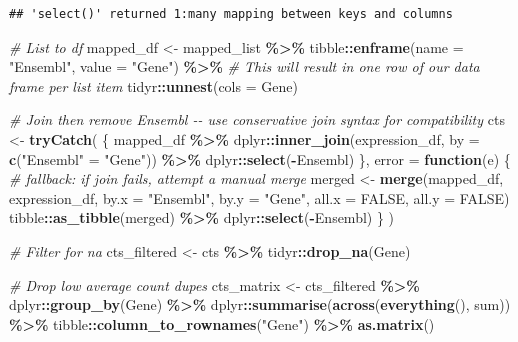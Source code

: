 \documentclass[
]{article}
\newenvironment{Shaded}{\begin{snugshade}}{\end{snugshade}}
\newcommand{\AttributeTok}[1]{\textcolor[rgb]{0.13,0.29,0.53}{#1}}
\newcommand{\CommentTok}[1]{\textcolor[rgb]{0.56,0.35,0.01}{\textit{#1}}}
\newcommand{\ConstantTok}[1]{\textcolor[rgb]{0.56,0.35,0.01}{#1}}
\newcommand{\ControlFlowTok}[1]{\textcolor[rgb]{0.13,0.29,0.53}{\textbf{#1}}}
\newcommand{\FunctionTok}[1]{\textcolor[rgb]{0.13,0.29,0.53}{\textbf{#1}}}
\newcommand{\NormalTok}[1]{#1}
\newcommand{\OtherTok}[1]{\textcolor[rgb]{0.56,0.35,0.01}{#1}}
\newcommand{\SpecialCharTok}[1]{\textcolor[rgb]{0.81,0.36,0.00}{\textbf{#1}}}
\newcommand{\StringTok}[1]{\textcolor[rgb]{0.31,0.60,0.02}{#1}}
\begin{document}
\begin{verbatim}
## 'select()' returned 1:many mapping between keys and columns
\end{verbatim}

\begin{Shaded}
\begin{Highlighting}[]
\CommentTok{\# List to df}
\NormalTok{mapped\_df }\OtherTok{\textless{}{-}}\NormalTok{ mapped\_list }\SpecialCharTok{\%\textgreater{}\%}
\NormalTok{  tibble}\SpecialCharTok{::}\FunctionTok{enframe}\NormalTok{(}\AttributeTok{name =} \StringTok{"Ensembl"}\NormalTok{, }\AttributeTok{value =} \StringTok{"Gene"}\NormalTok{) }\SpecialCharTok{\%\textgreater{}\%}
  \CommentTok{\# This will result in one row of our data frame per list item}
\NormalTok{  tidyr}\SpecialCharTok{::}\FunctionTok{unnest}\NormalTok{(}\AttributeTok{cols =}\NormalTok{ Gene)}

\CommentTok{\# Join then remove Ensembl {-}{-} use conservative join syntax for compatibility}
\NormalTok{cts }\OtherTok{\textless{}{-}} \FunctionTok{tryCatch}\NormalTok{(}
\NormalTok{  \{}
\NormalTok{    mapped\_df }\SpecialCharTok{\%\textgreater{}\%}
\NormalTok{      dplyr}\SpecialCharTok{::}\FunctionTok{inner\_join}\NormalTok{(expression\_df, }\AttributeTok{by =} \FunctionTok{c}\NormalTok{(}\StringTok{"Ensembl"} \OtherTok{=} \StringTok{"Gene"}\NormalTok{)) }\SpecialCharTok{\%\textgreater{}\%}
\NormalTok{      dplyr}\SpecialCharTok{::}\FunctionTok{select}\NormalTok{(}\SpecialCharTok{{-}}\NormalTok{Ensembl)}
\NormalTok{  \}, }\AttributeTok{error =} \ControlFlowTok{function}\NormalTok{(e) \{}
    \CommentTok{\# fallback: if join fails, attempt a manual merge}
\NormalTok{    merged }\OtherTok{\textless{}{-}} \FunctionTok{merge}\NormalTok{(mapped\_df, expression\_df, }\AttributeTok{by.x =} \StringTok{"Ensembl"}\NormalTok{, }\AttributeTok{by.y =} \StringTok{"Gene"}\NormalTok{, }\AttributeTok{all.x =} \ConstantTok{FALSE}\NormalTok{, }\AttributeTok{all.y =} \ConstantTok{FALSE}\NormalTok{)}
\NormalTok{    tibble}\SpecialCharTok{::}\FunctionTok{as\_tibble}\NormalTok{(merged) }\SpecialCharTok{\%\textgreater{}\%}\NormalTok{ dplyr}\SpecialCharTok{::}\FunctionTok{select}\NormalTok{(}\SpecialCharTok{{-}}\NormalTok{Ensembl)}
\NormalTok{  \}}
\NormalTok{)}

\CommentTok{\# Filter for na}
\NormalTok{cts\_filtered }\OtherTok{\textless{}{-}}\NormalTok{ cts }\SpecialCharTok{\%\textgreater{}\%}
\NormalTok{  tidyr}\SpecialCharTok{::}\FunctionTok{drop\_na}\NormalTok{(Gene)}

\CommentTok{\# Drop low average count dupes}
\NormalTok{cts\_matrix }\OtherTok{\textless{}{-}}\NormalTok{ cts\_filtered }\SpecialCharTok{\%\textgreater{}\%}
\NormalTok{  dplyr}\SpecialCharTok{::}\FunctionTok{group\_by}\NormalTok{(Gene) }\SpecialCharTok{\%\textgreater{}\%}
\NormalTok{  dplyr}\SpecialCharTok{::}\FunctionTok{summarise}\NormalTok{(}\FunctionTok{across}\NormalTok{(}\FunctionTok{everything}\NormalTok{(), sum)) }\SpecialCharTok{\%\textgreater{}\%}
\NormalTok{  tibble}\SpecialCharTok{::}\FunctionTok{column\_to\_rownames}\NormalTok{(}\StringTok{"Gene"}\NormalTok{) }\SpecialCharTok{\%\textgreater{}\%}
  \FunctionTok{as.matrix}\NormalTok{()}


\end{Highlighting}
\end{Shaded}
\end{document}
